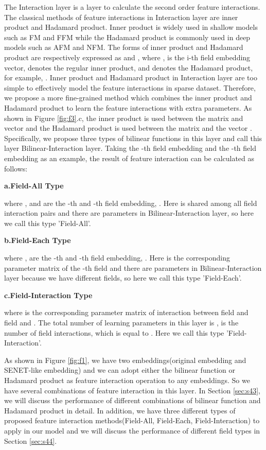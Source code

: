 \documentclass[sigconf]{acmart}
\begin{document}
The Interaction layer is a layer to calculate the second order feature
interactions. The classical methods of feature interactions in Interaction layer are inner product and Hadamard product. Inner product is widely used in shallow models such as FM and FFM while the Hadamard
product is commonly used in deep models such as AFM and NFM. The forms of inner product and Hadamard product are respectively expressed as 
and  , where ,  is the i-th field embedding vector,  denotes the regular inner product, and  denotes the Hadamard product, for example, . Inner product and Hadamard product in Interaction layer are too simple to effectively model the feature interactions in sparse dataset. Therefore, we propose a more fine-grained method which combines the inner product and Hadamard product
to learn the feature interactions with extra parameters. As shown in Figure \ref{fig:f3}.c, the inner product is used between the matrix  and
vector  and the Hadamard product is used between the matrix
 and the vector . Specifically, we propose three
types of bilinear functions in this layer and call this
layer Bilinear-Interaction layer. Taking the -th field embedding
 and the -th field embedding  as an example, the
result of feature interaction  can be calculated as follows:

\noindent\textbf{a.Field-All Type}

where , and  are the
-th and -th field embedding,
. Here  is shared among all
 field interaction pairs and there are 
parameters in Bilinear-Interaction layer, so here we call this type
'Field-All'.

\noindent\textbf{b.Field-Each Type}

where ,  are the -th
and -th field embedding,  . Here
 is the corresponding parameter matrix of the -th
field and there are  parameters in
Bilinear-Interaction layer because we have  different fields, so
here we call this type 'Field-Each'.

\noindent\textbf{c.Field-Interaction Type}

where  is the corresponding parameter matrix
of interaction between field  and field  and
. The total number of learning
parameters in this layer is ,  is the
number of field interactions, which is equal to .
Here we call this type 'Field-Interaction'.

As shown in Figure \ref{fig:f1}, we have two embeddings(original embedding and SENET-like embedding) and we can adopt either the bilinear function or Hadamard product as feature interaction operation to any embeddings. So we have several combinations of feature interaction in this layer. In Section \ref{sec:s43}, we will discuss the performance of different combinations of bilinear function and Hadamard product in detail. In addition, 
we have three different types of proposed feature interaction methods(Field-All, Field-Each, Field-Interaction) to apply in our model and we will discuss the performance of different field types in Section \ref{sec:s44}. 
\end{document}
